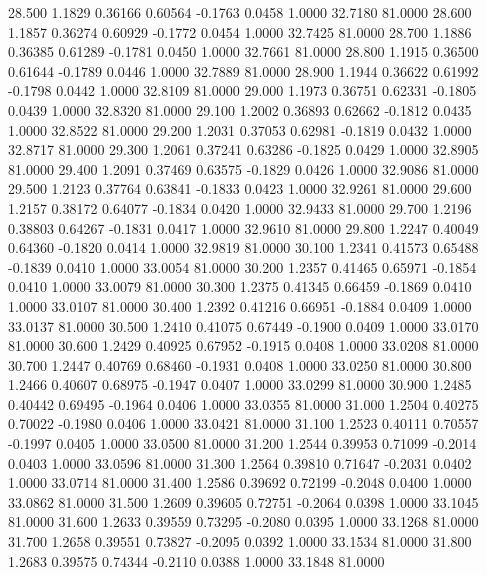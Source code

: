   28.500   1.1829   0.36166   0.60564  -0.1763   0.0458   1.0000  32.7180  81.0000
  28.600   1.1857   0.36274   0.60929  -0.1772   0.0454   1.0000  32.7425  81.0000
  28.700   1.1886   0.36385   0.61289  -0.1781   0.0450   1.0000  32.7661  81.0000
  28.800   1.1915   0.36500   0.61644  -0.1789   0.0446   1.0000  32.7889  81.0000
  28.900   1.1944   0.36622   0.61992  -0.1798   0.0442   1.0000  32.8109  81.0000
  29.000   1.1973   0.36751   0.62331  -0.1805   0.0439   1.0000  32.8320  81.0000
  29.100   1.2002   0.36893   0.62662  -0.1812   0.0435   1.0000  32.8522  81.0000
  29.200   1.2031   0.37053   0.62981  -0.1819   0.0432   1.0000  32.8717  81.0000
  29.300   1.2061   0.37241   0.63286  -0.1825   0.0429   1.0000  32.8905  81.0000
  29.400   1.2091   0.37469   0.63575  -0.1829   0.0426   1.0000  32.9086  81.0000
  29.500   1.2123   0.37764   0.63841  -0.1833   0.0423   1.0000  32.9261  81.0000
  29.600   1.2157   0.38172   0.64077  -0.1834   0.0420   1.0000  32.9433  81.0000
  29.700   1.2196   0.38803   0.64267  -0.1831   0.0417   1.0000  32.9610  81.0000
  29.800   1.2247   0.40049   0.64360  -0.1820   0.0414   1.0000  32.9819  81.0000
  30.100   1.2341   0.41573   0.65488  -0.1839   0.0410   1.0000  33.0054  81.0000
  30.200   1.2357   0.41465   0.65971  -0.1854   0.0410   1.0000  33.0079  81.0000
  30.300   1.2375   0.41345   0.66459  -0.1869   0.0410   1.0000  33.0107  81.0000
  30.400   1.2392   0.41216   0.66951  -0.1884   0.0409   1.0000  33.0137  81.0000
  30.500   1.2410   0.41075   0.67449  -0.1900   0.0409   1.0000  33.0170  81.0000
  30.600   1.2429   0.40925   0.67952  -0.1915   0.0408   1.0000  33.0208  81.0000
  30.700   1.2447   0.40769   0.68460  -0.1931   0.0408   1.0000  33.0250  81.0000
  30.800   1.2466   0.40607   0.68975  -0.1947   0.0407   1.0000  33.0299  81.0000
  30.900   1.2485   0.40442   0.69495  -0.1964   0.0406   1.0000  33.0355  81.0000
  31.000   1.2504   0.40275   0.70022  -0.1980   0.0406   1.0000  33.0421  81.0000
  31.100   1.2523   0.40111   0.70557  -0.1997   0.0405   1.0000  33.0500  81.0000
  31.200   1.2544   0.39953   0.71099  -0.2014   0.0403   1.0000  33.0596  81.0000
  31.300   1.2564   0.39810   0.71647  -0.2031   0.0402   1.0000  33.0714  81.0000
  31.400   1.2586   0.39692   0.72199  -0.2048   0.0400   1.0000  33.0862  81.0000
  31.500   1.2609   0.39605   0.72751  -0.2064   0.0398   1.0000  33.1045  81.0000
  31.600   1.2633   0.39559   0.73295  -0.2080   0.0395   1.0000  33.1268  81.0000
  31.700   1.2658   0.39551   0.73827  -0.2095   0.0392   1.0000  33.1534  81.0000
  31.800   1.2683   0.39575   0.74344  -0.2110   0.0388   1.0000  33.1848  81.0000
